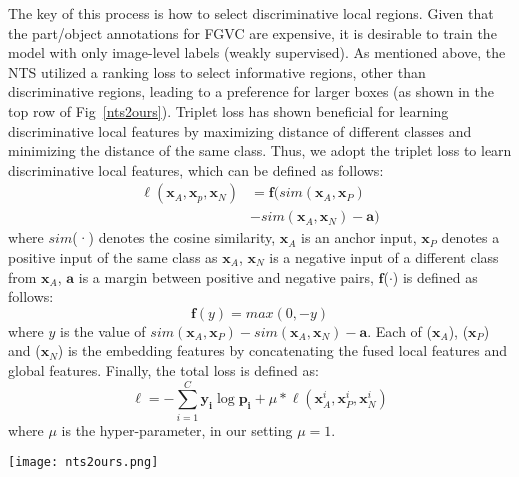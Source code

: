 \documentclass[10pt,twocolumn,letterpaper]{article}
\begin{document}
The key of this process is how to select discriminative local regions.
Given that the part/object annotations for FGVC are expensive, it is desirable to train the model with only image-level labels (weakly supervised). 
As mentioned above, the NTS utilized a ranking loss to select informative regions, other than discriminative regions, leading to a preference for larger boxes (as shown in the top row of Fig~\ref{nts2ours}). 
Triplet loss\cite{schroff2015facenet} has shown beneficial for learning
discriminative local features by maximizing distance of different classes and minimizing the distance of the same class.
Thus, we adopt the triplet loss to learn discriminative local features, which can be defined as follows:
\begin{equation}
\begin{split}
        \ell(\bm{x}_A, \bm{x}_p, \bm{x}_N) & =   \bm{f}(sim(\bm{x}_A,\bm{x}_P) \\
        & -  sim(\bm{x}_A, \bm{x}_N) - \bm{a})
\end{split}
\end{equation}
where $sim$(·) denotes the cosine similarity, $\bm{x}_A$ is an anchor input, $\bm{x}_P$ denotes a positive input of the same class as $\bm{x}_A$, $\bm{x}_N$ is a negative input of a different class from $\bm{x}_A$, $\bm{a}$ is a margin between positive and negative pairs, $\bm{f}$($\cdot$) is defined as follows:
\begin{equation}
    \bm{f}(y) = max(0, -y)
\end{equation}
where $y$ is the value of $sim(\bm{x}_A,\bm{x}_P) - sim(\bm{x}_A,\bm{x}_N) - \bm{a}$.
Each of ($\bm{x}_A$), ($\bm{x}_P$) and ($\bm{x}_N$) is the embedding features by concatenating the fused local features and global features.
Finally, the total loss is defined as:
\begin{equation}
    \ell =   -\sum_{i=1}^C \bm{y_i}\log \bm{p_i}  
     + \mu*\ell(\bm{x}_A^i,\bm{x}_P^i,\bm{x}_N^i)
\end{equation}
where $\mu$ is the hyper-parameter, in our setting $\mu = 1$. 


\begin{figure*}[t]
\begin{center}
\texttt{[image: nts2ours.png]}
\end{center}
   \caption{The Top4 selected boxes by NTS and our CCFR. Compared to NTS (the top row), our model tends to focus on smaller boxes containing discriminative parts.}
\label{nts2ours}
\end{figure*}
\end{document}
